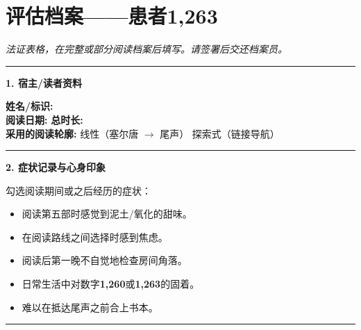 \cleardoublepage
\thispagestyle{empty}
\chapter*{评估档案——患者1,263}

\begingroup

\noindent\textit{法证表格，在完整或部分阅读档案后填写。请签署后交还档案员。}

\vspace{0.8em}
\noindent\rule{\textwidth}{0.8pt}
\vspace{0.5em}

\noindent\textbf{1. 宿主/读者资料}

\vspace{0.4em}
\noindent\textbf{姓名/标识:} \dotfill\\[0.4em]
\noindent\textbf{阅读日期:} \dotfill \quad \textbf{总时长:} \dotfill\\[0.4em]
\noindent\textbf{采用的阅读轮廓:} \quad [ ~ ] 线性（塞尔唐 $\to$ 尾声） \quad [ ~ ] 探索式（链接导航）

\vspace{1em}
\noindent\rule{\textwidth}{0.5pt}
\vspace{0.5em}

\noindent\textbf{2. 症状记录与心身印象}

\vspace{0.4em}
\noindent 勾选阅读期间或之后经历的症状：

\vspace{0.3em}
\begin{itemize}[leftmargin=1.5em,itemsep=0.2em]
  \item[$\square$] 阅读第五部时感觉到泥土/氧化的甜味。
  \item[$\square$] 在阅读路线之间选择时感到焦虑。
  \item[$\square$] 阅读后第一晚不自觉地检查房间角落。
  \item[$\square$] 日常生活中对数字\textbf{1,260}或\textbf{1,263}的固着。
  \item[$\square$] 难以在抵达尾声之前合上书本。
\end{itemize}

\vspace{0.8em}
\noindent\rule{\textwidth}{0.5pt}
\vspace{0.5em}

